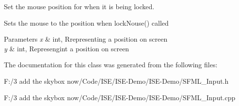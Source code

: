 Set the mouse position for when it is being locked. 

Sets the mouse to the position when lock\-Nouse() called


\begin{DoxyParams}{Parameters}
{\em x} & int, Rrepresenting a position on screen \\
\hline
{\em y} & int, Represengint a position on screen \\
\hline
\end{DoxyParams}


The documentation for this class was generated from the following files\-:\begin{DoxyCompactItemize}
\item 
F\-:/3 add the skybox now/\-Code/\-I\-S\-E/\-I\-S\-E-\/\-Demo/\-I\-S\-E-\/\-Demo/S\-F\-M\-L\-\_\-\-Input.\-h\item 
F\-:/3 add the skybox now/\-Code/\-I\-S\-E/\-I\-S\-E-\/\-Demo/\-I\-S\-E-\/\-Demo/S\-F\-M\-L\-\_\-\-Input.\-cpp\end{DoxyCompactItemize}
